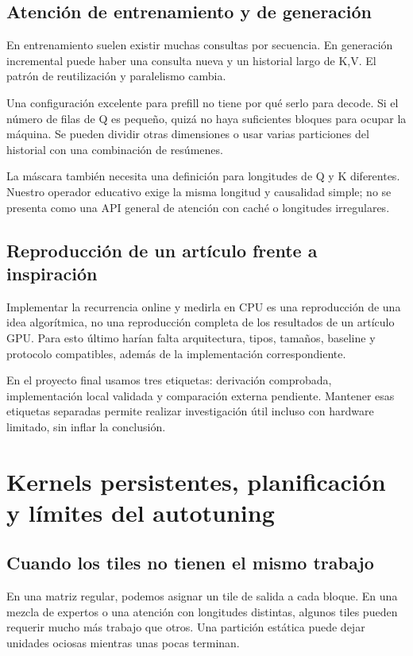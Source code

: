 \documentclass[12pt,a4paper,oneside]{report}
\begin{document}
\section{Atención de entrenamiento y de generación}
En entrenamiento suelen existir muchas consultas por secuencia. En generación incremental puede haber una consulta nueva y un historial largo de K,V. El patrón de reutilización y paralelismo cambia.

Una configuración excelente para prefill no tiene por qué serlo para decode. Si el número de filas de Q es pequeño, quizá no haya suficientes bloques para ocupar la máquina. Se pueden dividir otras dimensiones o usar varias particiones del historial con una combinación de resúmenes.

La máscara también necesita una definición para longitudes de Q y K diferentes. Nuestro operador educativo exige la misma longitud y causalidad simple; no se presenta como una API general de atención con caché o longitudes irregulares.

\section{Reproducción de un artículo frente a inspiración}
Implementar la recurrencia online y medirla en CPU es una reproducción de una idea algorítmica, no una reproducción completa de los resultados de un artículo GPU. Para esto último harían falta arquitectura, tipos, tamaños, baseline y protocolo compatibles, además de la implementación correspondiente.

En el proyecto final usamos tres etiquetas: derivación comprobada, implementación local validada y comparación externa pendiente. Mantener esas etiquetas separadas permite realizar investigación útil incluso con hardware limitado, sin inflar la conclusión.

\chapter{Kernels persistentes, planificación y límites del autotuning}
\label{ch:persistentes}
\section{Cuando los tiles no tienen el mismo trabajo}
En una matriz regular, podemos asignar un tile de salida a cada bloque. En una mezcla de expertos o una atención con longitudes distintas, algunos tiles pueden requerir mucho más trabajo que otros. Una partición estática puede dejar unidades ociosas mientras unas pocas terminan.
\end{document}
